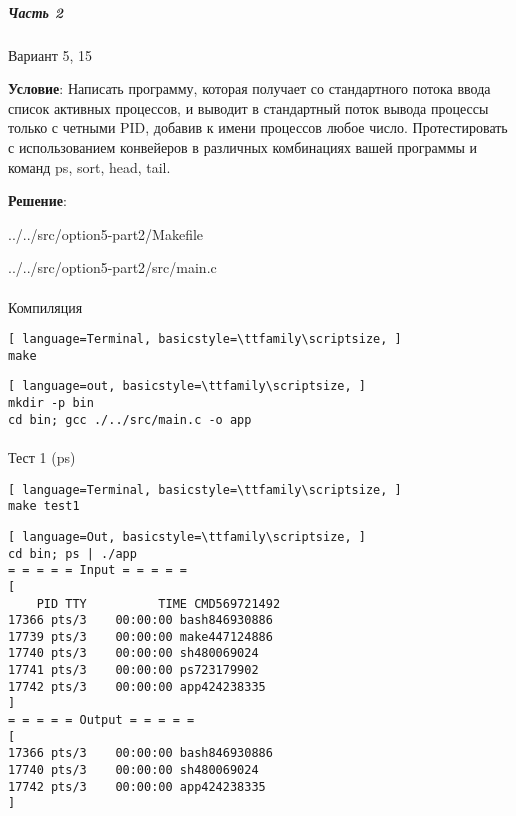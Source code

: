 \subparagraph{Часть 2} Вариант 5, 15

\textbf{Условие}:
Написать  программу,  которая  получает  со  стандартного  потока  ввода список активных процессов, и выводит в стандартный поток вывода процессы только с четными PID, добавив к имени процессов любое число. Протестировать с использованием конвейеров в различных комбинациях вашей программы и команд ps, sort, head, tail.

\textbf{Решение}:


{../../src/option5-part2/Makefile}

\newpage


{../../src/option5-part2/src/main.c}

\newpage

\paragraph{}
Компиляция

\begin{lstlisting}[ language=Terminal, basicstyle=\ttfamily\scriptsize, ]
make
\end{lstlisting}

\begin{lstlisting}[ language=out, basicstyle=\ttfamily\scriptsize, ]
mkdir -p bin
cd bin; gcc ./../src/main.c -o app
\end{lstlisting}
    
\paragraph{}
Тест 1 (ps)

\begin{lstlisting}[ language=Terminal, basicstyle=\ttfamily\scriptsize, ]
make test1
\end{lstlisting}

\begin{lstlisting}[ language=Out, basicstyle=\ttfamily\scriptsize, ]
cd bin; ps | ./app
= = = = = Input = = = = =
[
    PID TTY          TIME CMD569721492
17366 pts/3    00:00:00 bash846930886
17739 pts/3    00:00:00 make447124886
17740 pts/3    00:00:00 sh480069024
17741 pts/3    00:00:00 ps723179902
17742 pts/3    00:00:00 app424238335
]
= = = = = Output = = = = =
[
17366 pts/3    00:00:00 bash846930886
17740 pts/3    00:00:00 sh480069024
17742 pts/3    00:00:00 app424238335
]
\end{lstlisting}

